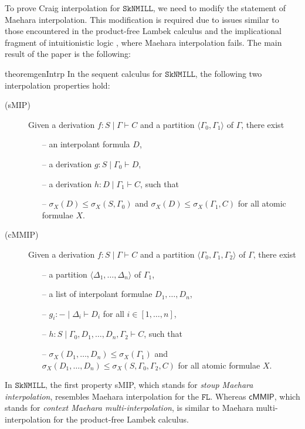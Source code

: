 \documentclass[sn-mathphys-num]{sn-jnl}%
\newcommand{\GG}{\Gamma}
\newcommand{\GD}{\Delta}
\newcommand{\vd}{\vdash}
\newcommand{\SkNMILL}{$\mathtt{SkNMILL}$}
\newcommand{\mf}[1]{\mathsf{#1}}
\newcommand{\gs}[1]{\sigma_{X} (#1)}
\newcommand{\vars}[1]{\mf{var} (#1)}
\newcommand{\FL}{$\mathtt{FL}$}
\newcommand{\sMIP}{\textsf{sMIP}}
\newcommand{\cMMIP}{\textsf{cMMIP}}
\theoremstyle{thmstyleone}%
\theoremstyle{thmstyletwo}%
\theoremstyle{thmstylethree}%
\begin{document}
To prove Craig interpolation for \SkNMILL, we need to modify the statement of Maehara interpolation.
This modification is required due to issues similar to those encountered in the product-free Lambek calculus \cite{Pentus1997} and the implicational fragment of intuitionistic logic \cite{Kanazawa2006}, where Maehara interpolation fails. The main result of the paper is the following:
\begin{restatable*}{theorem}{genIntrp}\label{genIntrp}
  In the sequent calculus for \SkNMILL, the following two interpolation properties hold:
  \begin{description}
    \item[(\sMIP)] Given a derivation $f: S \mid \GG \vd C$ and a partition $\langle \GG_0,\GG_1 \rangle$ of $\GG$, there exist
    \begin{itemize}
      \item[--] an interpolant formula $D$,
      \item[--] a derivation $g : S \mid \GG_0 \vd D$,
      \item[--] a derivation $h : D \mid \GG_1 \vd C$, such that
      \item[--] $\gs{D} \leq \gs{S , \GG_0}$ and $\gs{D} \leq \gs{\GG_1 , C}$ for all atomic formulae $X$.
    \end{itemize}
    \item[(\cMMIP)] Given a derivation $f: S \mid \GG \vd C$ and a partition $\langle \GG_0,\GG_1, \GG_2 \rangle$ of $\GG$, there exist  
    \begin{itemize}
      \item[--] a partition $\langle \GD_1, \dots, \GD_n \rangle$ of $\GG_1$,
      \item[--] a list of interpolant formulae $D_1, \dots, D_n$,
      \item[--] $g_i : {-} \mid \GD_i \vd D_i$ for  all $i \in [1, \dots, n]$,
      \item[--] $h : S \mid \GG_0, D_1, \dots, D_n, \GG_2 \vd C$, such that
      \item[--] $\gs{D_1, \dots, D_n} \leq \gs{\GG_1} $ and $\gs{D_1, \dots, D_n} \leq \gs{S, \GG_0, \GG_2, C}$ for all atomic formulae $X$.
    \end{itemize}
  \end{description}
\end{restatable*}
In \SkNMILL, the first property \sMIP, which stands for \emph{stoup Maehara interpolation}, resembles Maehara interpolation for the \FL. Whereas $\cMMIP$, which stands for \emph{context Maehara multi-interpolation}, is similar to Maehara multi-interpolation for the product-free Lambek calculus. %
\end{document}
